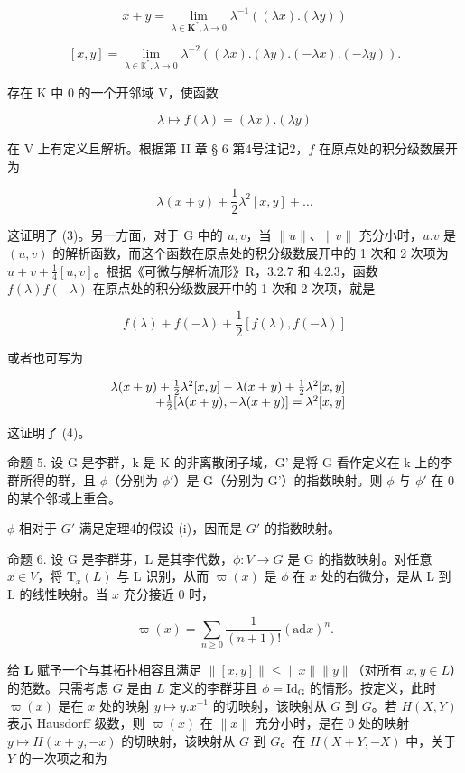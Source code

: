 \[
x + y = \lim _ {\lambda \in \mathbf {K} ^ {*}, \lambda \rightarrow 0} \lambda^ {- 1} ((\lambda x). (\lambda y))\tag{3}
\]

\[
[ x, y ] = \lim _ {\lambda \in \mathbb {K} ^ {*}, \lambda \rightarrow 0} \lambda^ {- 2} ((\lambda x). (\lambda y). (- \lambda x). (- \lambda y)).\tag{4}
\]

存在 K 中 0 的一个开邻域 V，使函数

\[
\lambda \mapsto f (\lambda) = (\lambda x). (\lambda y)
\]

在 V 上有定义且解析。根据第 II 章 § 6 第4号注记2，\(f\) 在原点处的积分级数展开为

\[
\lambda (x + y) + \frac {1}{2} \lambda^ {2} [ x, y ] + \dots
\]

这证明了 (3)。另一方面，对于 G 中的 \(u, v\)，当 \(\| u \|\)、\(\| v \|\) 充分小时，\(u.v\) 是 \((u, v)\) 的解析函数，而这个函数在原点处的积分级数展开中的 1 次和 2 次项为 \(u + v + \frac{1}{4}[u, v]\)。根据《可微与解析流形》R，3.2.7 和 4.2.3，函数 \(f(\lambda)f(-\lambda)\) 在原点处的积分级数展开中的 1 次和 2 次项，就是

\[
f (\lambda) + f (- \lambda) + \frac {1}{2} [ f (\lambda), f (- \lambda) ]
\]

或者也可写为

\[
\begin{array}{r l} \lambda (x + y) + \frac {1}{2} \lambda^ {2} [ x, y ] - \lambda (x + y) + \frac {1}{2} \lambda^ {2} [ x, y ] & \\ + \frac {1}{2} [ \lambda (x + y), - \lambda (x + y) ] = \lambda^ {2} [ x, y ] \end{array}
\]

这证明了 (4)。

命题 5. 设 G 是李群，k 是 K 的非离散闭子域，G' 是将 G 看作定义在 k 上的李群所得的群，且 \(\phi\)（分别为 \(\phi'\)）是 G（分别为 G'）的指数映射。则 \(\phi\) 与 \(\phi'\) 在 0 的某个邻域上重合。

\(\phi\) 相对于 \(G'\) 满足定理4的假设 (i)，因而是 \(G'\) 的指数映射。

命题 6. 设 G 是李群芽，L 是其李代数，\(\phi: V \to G\) 是 G 的指数映射。对任意 \(x \in V\)，将 \(\mathrm{T}_x(L)\) 与 L 识别，从而 \(\varpi(x)\) 是 \(\phi\) 在 \(x\) 处的右微分，是从 L 到 L 的线性映射。当 \(x\) 充分接近 0 时，

\[
\varpi (x) = \sum_ {n \geqslant 0} \frac {1}{(n + 1) !} (\mathrm{ad} x) ^ {n}.
\]

给 \(\mathbf{L}\) 赋予一个与其拓扑相容且满足 \(\| [x,y]\| \leqslant \| x\| \| y\|\)（对所有 \(x,y\in L\)）的范数。只需考虑 \(G\) 是由 \(L\) 定义的李群芽且 \(\phi = \mathrm{Id}_{\mathrm{G}}\) 的情形。按定义，此时 \(\varpi (x)\) 是在 \(x\) 处的映射 \(y\mapsto y.x^{-1}\) 的切映射，该映射从 \(G\) 到 \(G\)。若 \(H(X,Y)\) 表示 Hausdorff 级数，则 \(\varpi (x)\) 在 \(\| x\|\) 充分小时，是在 0 处的映射 \(y\mapsto H(x + y, - x)\) 的切映射，该映射从 \(G\) 到 \(G\)。在 \(H(X + Y, - X)\) 中，关于 \(Y\) 的一次项之和为

